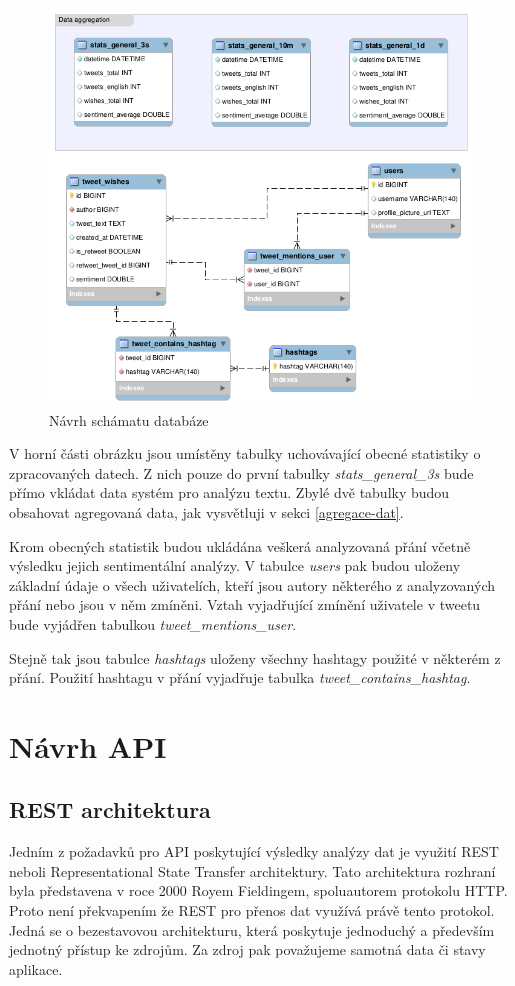 \documentclass[thesis=B,czech]{FITthesis}[2012/06/26]
\begin{document}
\begin{figure}[ht]
   	\centering
   	\includegraphics[width=1\textwidth]{../db_model.png}
   	\caption{Návrh schámatu databáze}
   	\label{fig:db-structure}
\end{figure}

V horní části obrázku jsou umístěny tabulky uchovávající obecné statistiky o zpracovaných datech. Z nich pouze do první tabulky \textit{stats\_general\_3s} bude přímo vkládat data systém pro analýzu textu. Zbylé dvě tabulky budou obsahovat agregovaná data, jak vysvětluji v sekci \ref{agregace-dat}. 

Krom obecných statistik budou ukládána veškerá analyzovaná přání včetně výsledku jejich sentimentální analýzy. V tabulce \textit{users} pak budou uloženy základní údaje o všech uživatelích, kteří jsou autory některého z analyzovaných přání nebo jsou v něm zmíněni. Vztah vyjadřující zmínění uživatele v tweetu bude vyjádřen tabulkou \textit{tweet\_mentions\_user}. 

Stejně tak jsou tabulce \textit{hashtags} uloženy všechny hashtagy použité v některém z přání. Použití hashtagu v přání vyjadřuje tabulka \textit{tweet\_contains\_hashtag}.

\section{Návrh API}
\label{rest}
\subsection{REST architektura}
	Jedním z požadavků pro API poskytující výsledky analýzy dat je využití REST neboli Representational State Transfer architektury. Tato architektura rozhraní byla představena v roce 2000 Royem Fieldingem, spoluautorem protokolu HTTP\cite{jjjlkll}. Proto není překvapením že REST pro přenos dat využívá právě tento protokol. Jedná se o bezestavovou architekturu, která poskytuje jednoduchý a především jednotný přístup ke zdrojům. Za zdroj pak považujeme samotná data či stavy aplikace. 
	
\end{document}
